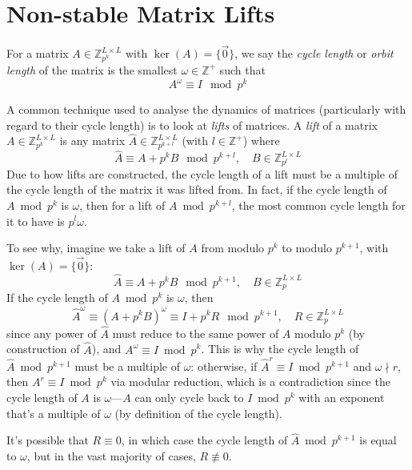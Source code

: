 \documentclass[a4paper, 12pt, reqno]{amsart}
\begin{document}
	\section{Non-stable Matrix Lifts}
		For a matrix $A \in \mathds{Z}_{p^k}^{L \times L}$ with $\ker(A) = \{\vec{0}\}$, we say the \emph{cycle length} or \emph{orbit length} of the matrix is the smallest
		$\omega \in \mathds{Z}^+$ such that
		\[
			A^\omega \equiv I \mod{p^k}
		\]
		
		A common technique used to analyse the dynamics of matrices (particularly with regard to their cycle length) is to look at \emph{lifts} of matrices. A
		\emph{lift} of a matrix $A \in \mathds{Z}_{p^k}^{L \times L}$ is any matrix $\hat{A} \in \mathds{Z}_{p^{k+l}}^{L \times L}$ (with $l \in \mathds{Z}^+$) where
		\[
			\hat{A} \equiv A + p^kB \mod{p^{k+l}},\quad B \in \mathds{Z}_{p^l}^{L \times L}
		\]
		Due to how lifts are constructed, the cycle length of a lift must be a multiple of the cycle length of the matrix it was lifted from. In fact, if the cycle length of
		$A \bmod{p^k}$ is $\omega$, then for a lift of $A \bmod{p^{k+l}}$, the most common cycle length for it to have is $p^l\omega$.
		
		To see why, imagine we take a lift of $A$ from modulo $p^k$ to modulo $p^{k+1}$, with $\ker{(A)} = \{\vec{0}\}$:
		\[
			\hat{A} \equiv A + p^kB \mod{p^{k+1}},\quad B \in \mathds{Z}_p^{L \times L}
		\]
		If the cycle length of $A \bmod{p^k}$ is $\omega$, then
		\[
			\hat{A}^\omega \equiv (A + p^kB)^\omega \equiv I + p^kR \mod{p^{k+1}},\quad R \in \mathds{Z}_p^{L \times L}
		\]
		since any power of $\hat{A}$ must reduce to the same power of $A$ modulo $p^k$ (by construction of $\hat{A}$), and $A^\omega \equiv I \bmod{p^k}$. This is why 
		the cycle length of $\hat{A} \bmod{p^{k+1}}$ must be a multiple of $\omega$: otherwise, if $\hat{A}^r \equiv I \bmod{p^{k+1}}$ and $\omega \nmid r$, then
		$A^r \equiv I \bmod{p^k}$ via modular reduction, which is a contradiction since the cycle length of $A$ is $\omega$---$A$ can only cycle back to $I \bmod{p^k}$ with 
		an exponent that's a multiple of $\omega$ (by definition of the cycle length). 
		
		It's possible that $R \equiv 0$, in which case the cycle length of $\hat{A} \bmod{p^{k+1}}$ is equal to $\omega$, but in the vast majority of cases, 
		$R \not\equiv 0$.
		
\end{document}
